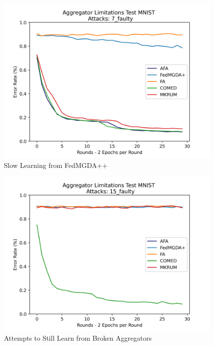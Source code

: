 \begin{figure}[htbp]
	\centering
    \includegraphics[scale=0.5]{initial/graphs/7_faulty.png}
	\caption{Slow Learning from FedMGDA++}
	\label{fig:7faulty}
\end{figure}

\begin{figure}[htbp]
	\centering
    \includegraphics[scale=0.5]{initial/graphs/15_faulty.png}
	\caption{Attempts to Still Learn from Broken Aggregators}
	\label{fig:15faulty}
\end{figure}

